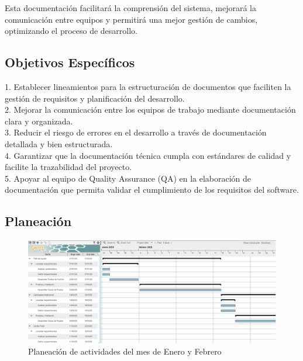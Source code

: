 \documentclass[12pt,letterpaper,spanish, xcolor=table]{report}
\numberwithin{figure}{subsection}
\begin{document}
	Esta documentación facilitará la comprensión del sistema, mejorará la comunicación entre equipos y permitirá una mejor gestión de cambios, optimizando el proceso de desarrollo.
	


\subsection{Objetivos Específicos}

	1. Establecer lineamientos para la estructuración de documentos que faciliten la gestión de requisitos y planificación del desarrollo.\\
	
	2. Mejorar la comunicación entre los equipos de trabajo mediante documentación clara y organizada.\\
	
	3. Reducir el riesgo de errores en el desarrollo a través de documentación detallada y bien estructurada.\\
	
	4. Garantizar que la documentación técnica cumpla con estándares de calidad y facilite la trazabilidad del proyecto.\\
	
	5. Apoyar al equipo de Quality Assurance (QA) en la elaboración de documentación que permita validar el cumplimiento de los requisitos del software.\\

	
	
\subsection{Planeación}

	\begin{figure}[H]
		\centering
		\includegraphics[width=1.0\textwidth]
		{Imagenes/Planeacion/EneFeb.png}
		\caption{Planeación de actividades del mes de Enero y Febrero
		}\label{a2}
	\end{figure}
	
\end{document}
